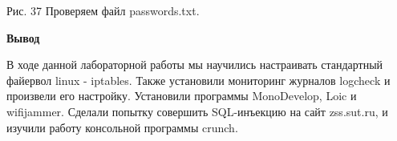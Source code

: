 \documentclass[a4paper,14pt]{extarticle}
\begin{document}
\begin{center}
        Рис. 37 Проверяем файл passwords.txt.
        \vspace{1ex}

   \end{center}

   \textbf{Вывод}

   В ходе данной лабораторной работы мы научились настраивать стандартный
   файервол linux - iptables. Также установили мониторинг журналов logcheck и \linebreak
   произвели его настройку. Установили программы MonoDevelop, Loic и wifijammer. 
   Сделали попытку совершить SQL-инъекцию на сайт zss.sut.ru, и изучили работу 
   консольной программы crunch.
\end{document}
